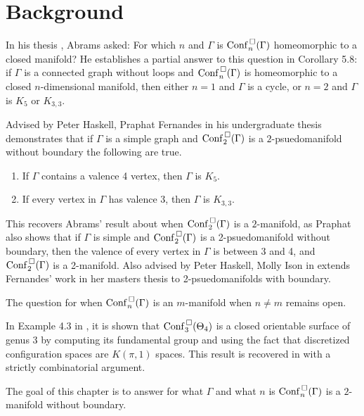 \section{Background}
In his thesis \cite{abrams2000configurationspaces}, Abrams asked:
For which \(n\) and \(\Gamma\) is \(\mathrm{Conf}^{\,\square}_n(\Gamma)\) homeomorphic to a closed manifold?
He establishes a partial answer to this question in Corollary 5.8: 
if \(\Gamma\) is a connected graph
without loops and \(\mathrm{Conf}^{\,\square}_n(\Gamma)\) is homeomorphic to a closed
\(n\)-dimensional manifold, then either \(n = 1\) and \(\Gamma\) is a cycle, or
\(n = 2\) and \(\Gamma\) is \(K_5\) or \(K_{3,3}\).

Advised by Peter Haskell, Praphat Fernandes in his undergraduate thesis
demonstrates that if \(\Gamma\) is a simple graph and \(\mathrm{Conf}^{\,\square}_2(\Gamma)\)
is a \(2\)-psuedomanifold without boundary the following are true.
\begin{enumerate}
    \item If \(\Gamma\) contains a valence 4 vertex, then \(\Gamma\) is \(K_5\).
    \item If every vertex in \(\Gamma\) has valence 3, then \(\Gamma\) is \(K_{3,3}\).
\end{enumerate}
This recovers Abrams' result about when \(\mathrm{Conf}^{\,\square}_2(\Gamma)\) 
is a \(2\)-manifold, as Praphat also shows that
if \(\Gamma\) is simple and \(\mathrm{Conf}^{\,\square}_2(\Gamma)\) is a 2-psuedomanifold without boundary,
then the valence of every vertex in \(\Gamma\) is between 3 and 4,
and \(\mathrm{Conf}^{\,\square}_2(\Gamma)\) is a 2-manifold. Also advised by Peter Haskell, Molly Ison in \cite{ison2005two} 
extends Fernandes' work in her masters thesis to 2-psuedomanifolds with boundary.

The question for when \(\mathrm{Conf}^{\,\square}_n(\Gamma)\) is an \(m\)-manifold 
when \(n \neq m\) remains open.

In Example 4.3 in \cite{ko2012characteristics}, it is shown that \(\mathrm{Conf}^{\,\square}_3(\Theta_4)\)
is a closed orientable surface of genus 3 by computing its fundamental group and using the
fact that discretized configuration spaces are \(K(\pi, 1)\) spaces.
This result is recovered in \cite{appiah2024algebraicstructurehyperbolicgraph}
with a strictly combinatorial argument.

The goal of this chapter is to
answer for what \(\Gamma\) and what \(n\) is
\(\mathrm{Conf}^{\,\square}_n(\Gamma)\) is a \(2\)-manifold without boundary.